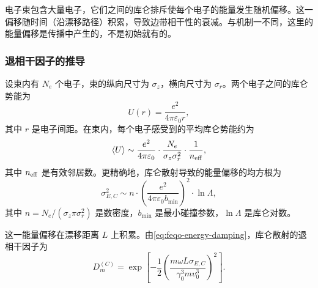 电子束包含大量电子，它们之间的库仑排斥使每个电子的能量发生随机偏移。这一偏移随时间（沿漂移路径）积累，导致边带相干性的衰减。与机制一不同，这里的能量偏移是传播中产生的，不是初始就有的。

\subsubsection{退相干因子的推导}

设束内有 $N_e$ 个电子，束的纵向尺寸为 $\sigma_z$，横向尺寸为 $\sigma_r$。两个电子之间的库仑势能为
\begin{equation}
U(r)=\frac{e^2}{4\pi\varepsilon_0 r},
\label{eq:feqo-coulomb-potential}
\end{equation}
其中 $r$ 是电子间距。在束内，每个电子感受到的平均库仑势能约为
\begin{equation}
\langle U\rangle\sim\frac{e^2}{4\pi\varepsilon_0}\cdot\frac{N_e}{\sigma_z\sigma_r^2}\cdot\frac{1}{n_{\rm eff}},
\label{eq:feqo-mean-coulomb}
\end{equation}
其中 $n_{\rm eff}$ 是有效邻居数。更精确地，库仑散射导致的能量偏移的均方根为
\begin{equation}
\sigma_{E,C}^2\sim n\cdot\left(\frac{e^2}{4\pi\varepsilon_0 b_{\min}}\right)^2\cdot\ln\Lambda,
\label{eq:feqo-coulomb-energy-spread}
\end{equation}
其中 $n=N_e/(\sigma_z\pi\sigma_r^2)$ 是数密度，$b_{\min}$ 是最小碰撞参数，$\ln\Lambda$ 是库仑对数。

这一能量偏移在漂移距离 $L$ 上积累。由\cref{eq:feqo-energy-damping}，库仑散射的退相干因子为
\begin{equation}
D_m^{(C)}=\exp\!\left[-\frac{1}{2}\left(\frac{m\omega L\sigma_{E,C}}{\gamma_0^3mv_0^3}\right)^2\right].
\label{eq:feqo-coulomb-damping}
\end{equation}

